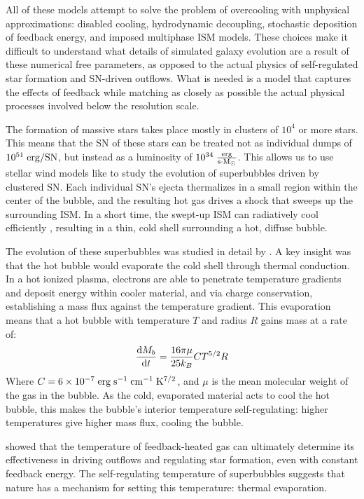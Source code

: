 All of these models attempt to solve the problem of overcooling with unphysical
approximations: disabled cooling, hydrodynamic decoupling, stochastic deposition
of feedback energy, and imposed multiphase ISM models.  These choices make it
difficult to understand what details of simulated galaxy evolution are a result
of these numerical free parameters, as opposed to the actual physics of
self-regulated star formation and SN-driven outflows.  What is needed is a model that
captures the effects of feedback while matching as closely as possible the
actual physical processes involved below the resolution scale.

The formation of massive stars takes place mostly in clusters of $10^4$ or more
stars.  This means that the SN of these stars can be treated not as
individual dumps of $10^{51}\;\rm{erg/SN}$, but instead as a luminosity of
$10^{34}\;\rm{\frac{erg}{s \cdot M_\odot}}$.  This allows us to use stellar wind
models like \citet{Weaver1977} to study the evolution of superbubbles driven by
clustered SN.  Each individual SN's ejecta thermalizes in a small
region within the center of the bubble, and the resulting hot gas drives a shock
that sweeps up the surrounding ISM.  In a short time, the swept-up ISM can
radiatively cool efficiently , resulting in a thin, cold shell surrounding a
hot, diffuse bubble.

The evolution of these superbubbles was studied in detail by \citet{MacLow1988}.
A key insight was that the hot bubble would evaporate the cold shell through
thermal conduction.  In a hot ionized plasma, electrons are able to penetrate
temperature gradients and deposit energy within cooler material, and via charge
conservation, establishing a mass flux against the temperature gradient.  This
evaporation means that a hot bubble with temperature $T$ and radius $R$ gains
mass at a rate of:
\begin{equation}
    \frac{{\rm d }M_b}{{\rm d}t} = \frac{16\pi\mu}{25k_B} CT^{5/2}R
\end{equation}
Where $C=6\times10^{-7}\;\rm{erg\;s^{-1}\;cm^{-1}\;K^{7/2}}$, and $\mu$ is the
mean molecular weight of the gas in the bubble.  As the cold, evaporated
material acts to cool the hot bubble, this makes the bubble's interior
temperature self-regulating: higher temperatures give higher mass flux, cooling
the bubble.

\citet{DallaVecchia2012} showed that the temperature of feedback-heated gas can
ultimately determine its effectiveness in driving outflows and regulating star
formation, even with constant feedback energy.  The self-regulating temperature
of superbubbles suggests that nature has a mechanism for setting
this temperature: thermal evaporation.

